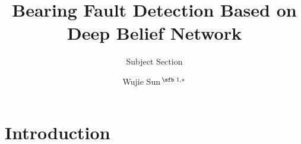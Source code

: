 \documentclass{modified}
\begin{document}

\subtitle{Subject Section}

\title[Bearing Fault Detection Based on Deep Belief Network]{Bearing Fault Detection Based on Deep Belief Network}
\author[Sun.]{Wujie Sun\,$^{\text{\sfb 1,}*}$}
\address{$^{\text{\sf 1}}$School of Software Engineering, South China University of Technology, Guangzhou 510006, P.R. China.}





\maketitle


\section{Introduction}



%
%
%
%

%

%
%
%

%
% 
 
\end{document}
